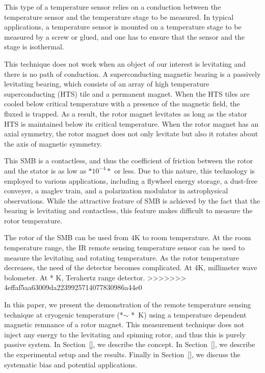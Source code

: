 This type of a temperature sensor relies on a conduction between the temperature sensor and the temperature stage to be measured.
In typical applications, a temperature sensor is mounted on a temperature stage to be measured by a screw or glued, and one has to ensure that the sensor and the stage is isothermal.

This technique does not work when an object of our interest is levitating and there is no path of conduction.
A superconducting magnetic bearing is a passively levitating bearing, which consists of an array of high temperature superconducting (HTS) tile and a permanent magnet.
When the HTS tiles are cooled below critical temperature with a presence of the magnetic field, the fluxed is trapped.
As a result, the rotor magnet levitates as long as the stator HTS is maintained below its critical temperature.
When the rotor magnet has an axial symmetry, the rotor magnet does not only levitate but also it rotates about the axis of magnetic symmetry.

This SMB is a contactless, and thus the coefficient of friction between the rotor and the stator is as low as $*10^{-4}*$ or less.
Due to this nature, this technology is employed to various applications, including a flywheel energy storage, a dust-free conveyer, a maglev train, and a polarization modulator in astrophysical observations.
While the attractive feature of SMB is achieved by the fact that the bearing is levitating and contactless, this feature makes difficult to measure the rotor temperature.

The rotor of the SMB can be used from 4K to room temperature.
At the room temperature range, the IR remote sensing temperature sensor can be used to measure the levitating and rotating temperature.
As the rotor temperature decreases, the need of the detector becomes complicated.
At 4K, millimeter wave bolometer.
At * K, Terahertz range detector.
>>>>>>> 4effaf5aa63009da2239925714077830986a44e0

In this paper, we present the demonstration of the remote temperature sensing technique at cryogenic temperature (*$\sim$ *~K) using a temperature dependent magnetic remnance of a rotor magnet. 
This measurement technique does not inject any energy to the levitating and spinning rotor, and thus this is purely passive system. 
In Section~\ref{}, we describe the concept. In Section~\ref{}, we describe the experimental setup and the results. Finally in Section~\ref{}, we discuss the systematic bias and potential applications.

